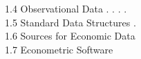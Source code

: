 1.4 Observational Data . . . .\\
1.5 Standard Data Structures .\\
1.6 Sources for Economic Data\\
1.7 Econometric Software